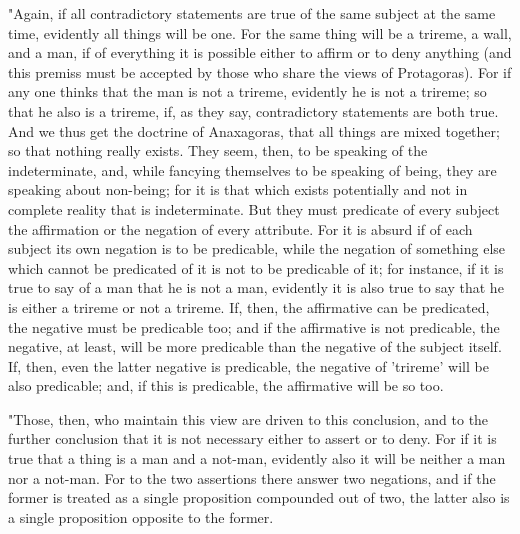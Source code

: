 "Again, if all contradictory statements are true of the same subject
at the same time, evidently all things will be one. For the same thing
will be a trireme, a wall, and a man, if of everything it is possible
either to affirm or to deny anything (and this premiss must be accepted
by those who share the views of Protagoras). For if any one thinks
that the man is not a trireme, evidently he is not a trireme; so that
he also is a trireme, if, as they say, contradictory statements are
both true. And we thus get the doctrine of Anaxagoras, that all things
are mixed together; so that nothing really exists. They seem, then,
to be speaking of the indeterminate, and, while fancying themselves
to be speaking of being, they are speaking about non-being; for it
is that which exists potentially and not in complete reality that
is indeterminate. But they must predicate of every subject the affirmation
or the negation of every attribute. For it is absurd if of each subject
its own negation is to be predicable, while the negation of something
else which cannot be predicated of it is not to be predicable of it;
for instance, if it is true to say of a man that he is not a man,
evidently it is also true to say that he is either a trireme or not
a trireme. If, then, the affirmative can be predicated, the negative
must be predicable too; and if the affirmative is not predicable,
the negative, at least, will be more predicable than the negative
of the subject itself. If, then, even the latter negative is predicable,
the negative of 'trireme' will be also predicable; and, if this is
predicable, the affirmative will be so too. 

"Those, then, who maintain this view are driven to this conclusion,
and to the further conclusion that it is not necessary either to assert
or to deny. For if it is true that a thing is a man and a not-man,
evidently also it will be neither a man nor a not-man. For to the
two assertions there answer two negations, and if the former is treated
as a single proposition compounded out of two, the latter also is
a single proposition opposite to the former. 

